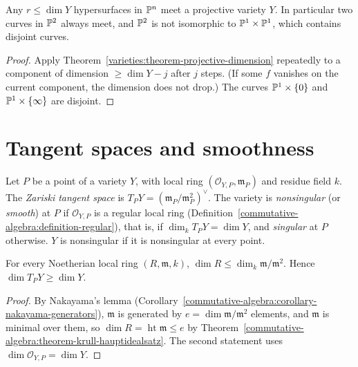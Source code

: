 \begin{corollary}\label{varieties:corollary-intersections-nonempty}
Any $r \leq \dim Y$ hypersurfaces in $\mathbb{P}^n$ meet a projective variety $Y$. In particular two curves in $\mathbb{P}^2$ always meet, and $\mathbb{P}^2$ is not
isomorphic to $\mathbb{P}^1 \times \mathbb{P}^1$, which contains disjoint curves.
\end{corollary}

\begin{proof}
Apply Theorem~\ref{varieties:theorem-projective-dimension} repeatedly to a component of dimension $\geq \dim Y - j$ after $j$ steps. (If some $f$
vanishes on the current component, the dimension does not drop.) The curves $\mathbb{P}^1 \times \{0\}$ and $\mathbb{P}^1 \times \{\infty\}$ are disjoint.
\end{proof}

\section{Tangent spaces and smoothness}\label{varieties:section-smoothness}

\begin{definition}\label{varieties:definition-tangent-space}
Let $P$ be a point of a variety $Y$, with local ring $(\mathcal{O}_{Y,P}, \mathfrak{m}_P)$ and residue field $k$. The \emph{Zariski tangent space}
is $T_PY = (\mathfrak{m}_P/\mathfrak{m}_P^2)^\vee$. The variety is \emph{nonsingular} (or \emph{smooth}) at $P$ if $\mathcal{O}_{Y,P}$ is a regular
local ring (Definition~\ref{commutative-algebra:definition-regular}), that is, if $\dim_kT_PY = \dim Y$, and \emph{singular} at $P$ otherwise.
$Y$ is nonsingular if it is nonsingular at every point.
\end{definition}

\begin{lemma}\label{varieties:lemma-tangent-dimension}
For every Noetherian local ring $(R, \mathfrak{m}, k)$, $\dim R \leq \dim_k\mathfrak{m}/\mathfrak{m}^2$. Hence $\dim T_PY \geq \dim Y$.
\end{lemma}

\begin{proof}
By Nakayama's lemma (Corollary~\ref{commutative-algebra:corollary-nakayama-generators}), $\mathfrak{m}$ is generated by
$e = \dim\mathfrak{m}/\mathfrak{m}^2$ elements, and $\mathfrak{m}$ is minimal over them, so $\dim R = \operatorname{ht}\mathfrak{m} \leq e$ by
Theorem~\ref{commutative-algebra:theorem-krull-hauptidealsatz}. The second statement uses $\dim\mathcal{O}_{Y,P} = \dim Y$.
\end{proof}

